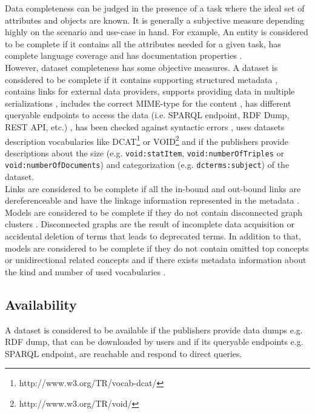 \documentclass[onecolumn, crcready]{iosart2c}
\begin{document}
Data completeness can be judged in the presence of a task where the ideal set of attributes and objects are known. It is generally a subjective measure depending highly on the scenario and use-case in hand. For example, An entity is considered to be complete if it contains all the attributes needed for a given task, has complete language coverage \cite{Mader2012} and has documentation properties \cite{w3c_skos_rec}\cite{Mader2012}.\\ However, dataset completeness has some objective measures. A dataset is considered to be complete if it contains supporting structured metadata \cite{Hogan2010}, contains links for external data providers, supports providing data in multiple serializations \cite{Framework2012}, includes the correct MIME-type for the content \cite{Hogan2010}, has different queryable endpoints to access the data (i.e. SPARQL endpoint, RDF Dump, REST API, etc.) \cite{Framework2012}, has been checked against syntactic errors \cite{Hogan2010}, uses datasets description vocabularies like DCAT\footnote{http://www.w3.org/TR/vocab-dcat/} or VOID\footnote{http://www.w3.org/TR/void/} and if the publishers provide descriptions about the size (e.g. \texttt{void:statItem}, \texttt{void:numberOfTriples} or \texttt{void:numberOfDocuments}) and categorization (e.g. \texttt{dcterms:subject}) of the dataset.\\ Links are considered to be complete if all the in-bound and out-bound links are dereferenceable \cite{Hogan2010}\cite{Mader2012}\cite{Gueret2012} and have the linkage information represented in the metadata \cite{Hogan2010}.\\ Models are considered to be complete if they do not contain disconnected graph clusters \cite{Mader2012}. Disconnected graphs are the result of incomplete data acquisition or accidental deletion of terms that leads to deprecated terms. In addition to that, models are considered to be complete if they do not contain omitted top concepts or unidirectional related concepts \cite{Hogan2010} and if there exists metadata information about the kind and number of used vocabularies \cite{Framework2012}.

\subsection{Availability}

A dataset is considered to be available if the publishers provide data dumps e.g. RDF dump, that can be downloaded by users \cite{flemming2010}\cite{Hogan2010} and if its queryable endpoints e.g. SPARQL endpoint, are reachable and respond to direct queries.
\end{document}
